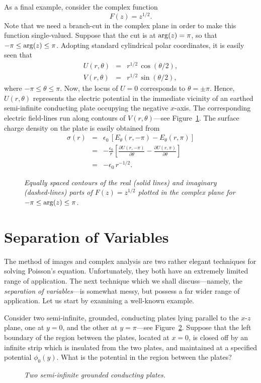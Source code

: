 As a final example, consider the complex function
\begin{equation}
F(z) = z^{1/2}.
\end{equation}
Note that we need a branch-cut in the complex plane in order to make this function single-valued. Suppose that the cut is at ${\rm arg}(z)=\pi$,
so that $-\pi \leq {\rm arg}(z) \leq \pi$. Adopting standard cylindrical polar
coordinates, it is easily seen that
\begin{eqnarray}
U(r,\theta) &=& r^{1/2}\,\cos(\theta/2),\\[0.5ex]
V(r,\theta)&=& r^{1/2}\,\sin(\theta/2),
\end{eqnarray}
where $-\pi\leq \theta \leq \pi$. Now, the locus of $U=0$ corresponds
to $\theta=\pm \pi$. Hence, $U(r,\theta)$ represents the electric potential
in the immediate vicinity of an earthed semi-infinite conducting plate occupying the negative
$x$-axis. The corresponding electric field-lines run along 
contours of $V(r,\theta)$---see Figure~\ref{fff6}. The surface charge
density on the plate is easily obtained from
\begin{eqnarray}
\sigma(r) &=& \epsilon_0\,\left[E_\theta(r,-\pi)-E_\theta(r,\pi)\right]\nonumber\\[0.5ex]
&=& -\frac{\epsilon_0}{r}\left[\frac{\partial U(r,-\pi)}{\partial\theta}-\frac{\partial U(r,\pi)}{\partial\theta}\right]\nonumber\\[0.5ex]
&=& - \epsilon_0\,r^{-1/2}.
\end{eqnarray}
\begin{figure}
\epsfysize=3in
\centerline{}
\caption{\em Equally spaced contours of the real (solid lines) and imaginary (dashed-lines) parts of $F(z)=z^{1/2}$ plotted in the complex plane for $-\pi\leq {\rm arg}(z)\leq \pi$. }\label{fff6}
\end{figure}


\section{Separation of Variables}
The method of images and complex analysis are two rather elegant techniques
for solving Poisson's equation. Unfortunately, they both  have an
extremely limited range of application. The next technique which we shall discuss---namely, the {\em separation of variables}---is somewhat  messy,
but possess a  far wider range of application. Let us start by examining a well-known
example.

Consider two semi-infinite, grounded, conducting plates lying parallel to the
$x$-$z$ plane, one at $y=0$, and the other at $y=\pi$---see Figure~\ref{f44}. Suppose that the left boundary of the region between the plates, located at
$x=0$, is closed off by an infinite strip which is insulated from the two plates,
and maintained at a specified potential $\phi_0(y)$. What is the
potential in the region between the plates?
\begin{figure}
\epsfysize=1.25in
\centerline{}
\caption{\em Two semi-infinite grounded conducting plates.}\label{f44}
\end{figure}

